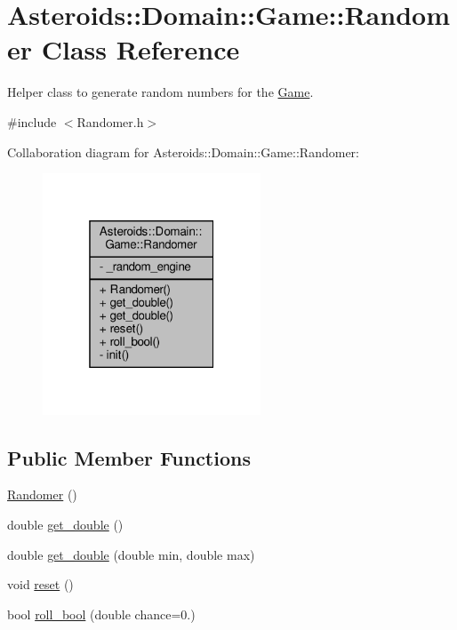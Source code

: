 \hypertarget{classAsteroids_1_1Domain_1_1Game_1_1Randomer}{}\section{Asteroids\+:\+:Domain\+:\+:Game\+:\+:Randomer Class Reference}
\label{classAsteroids_1_1Domain_1_1Game_1_1Randomer}


Helper class to generate random numbers for the \hyperlink{classAsteroids_1_1Domain_1_1Game_1_1Game}{Game}.  




{\ttfamily \#include $<$Randomer.\+h$>$}



Collaboration diagram for Asteroids\+:\+:Domain\+:\+:Game\+:\+:Randomer\+:\nopagebreak
\begin{figure}[H]
\begin{center}
\leavevmode
\includegraphics[width=184pt]{classAsteroids_1_1Domain_1_1Game_1_1Randomer__coll__graph}
\end{center}
\end{figure}
\subsection*{Public Member Functions}
\begin{DoxyCompactItemize}
\item 
\hyperlink{classAsteroids_1_1Domain_1_1Game_1_1Randomer_a8e660c706ed181bde7b6f6310285b8e9}{Randomer} ()
\item 
double \hyperlink{classAsteroids_1_1Domain_1_1Game_1_1Randomer_a43965ff48fe73e5eef6e1c223a94f463}{get\+\_\+double} ()
\item 
double \hyperlink{classAsteroids_1_1Domain_1_1Game_1_1Randomer_af56d89fbf17d7e82e5470b1716a0dc34}{get\+\_\+double} (double min, double max)
\item 
void \hyperlink{classAsteroids_1_1Domain_1_1Game_1_1Randomer_af57f0a4d202d7d2b314964231bf5c5b3}{reset} ()
\item 
bool \hyperlink{classAsteroids_1_1Domain_1_1Game_1_1Randomer_a9d5a2a8aeb43ade5f1a0a9a212f4dd4a}{roll\+\_\+bool} (double chance=0.)
\end{DoxyCompactItemize}

